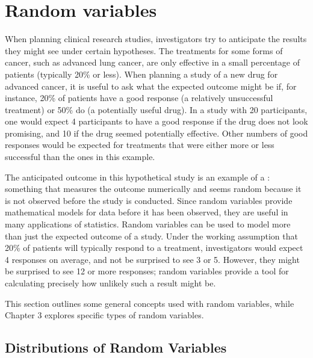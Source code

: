 

\textC{\newpage}



\section{Random variables}
\label{randomVariablesSection}


When planning clinical research studies, investigators try to anticipate the results they might see under certain hypotheses. The treatments for some forms of cancer, such as advanced lung cancer, are only effective in a small percentage of patients (typically 20\% or less). When planning a study of a new drug for advanced cancer, it is useful to ask what the expected outcome might be if, for instance, 20\% of patients have a good response (a relatively unsuccessful treatment) or 50\% do (a potentially useful drug).  In a study with 20 participants, one would expect 4 participants to have a good response if the drug does not look promising, and 10 if the drug seemed potentially effective. Other numbers of good responses would be expected for treatments that were either more or less successful than the ones in this example. 

The anticipated outcome in this hypothetical study is an example of a : something that measures the outcome numerically and seems random because it is not observed before the study is conducted. Since random variables provide mathematical models for data before it has been observed, they are useful in many applications of statistics. Random variables can be used to model more than just the expected outcome of a study. Under the working assumption that 20\% of patients will typically respond to a treatment, investigators would expect 4 responses on average, and not be surprised to see 3 or 5. However, they might be surprised to see 12 or more responses; random variables provide a tool for calculating precisely how unlikely such a result might be.

This section outlines some general concepts used with random variables, while Chapter 3 explores specific types of random variables.


\subsection{Distributions of Random Variables}

